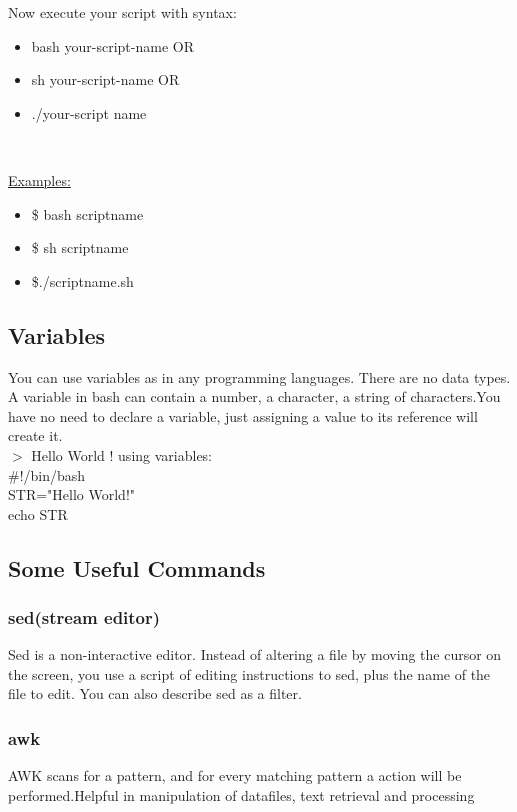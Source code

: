 \documentclass[a4paper, 12pt]{article}
\begin{document}
Now execute your script with syntax:
\begin{itemize}
\item bash your-script-name OR
\item sh your-script-name OR
\item ./your-script name
\end{itemize}

\

\underline{Examples:} \\
\begin{itemize}
\item \$ bash scriptname
\item \$ sh scriptname
\item \$./scriptname.sh
\end{itemize}

\subsection{Variables}
You can use variables as in any programming languages. There are no data types. A variable in bash can contain a number, 
a character, a string of characters.You have no need to declare a variable, just assigning a value to its reference will create it. \\

$>$ Hello World ! using variables:\\

 \noindent \#!/bin/bash \\         
 STR="Hello World!" \\
 echo \textdollar STR  \\
 
\subsection{Some Useful Commands} 
\subsubsection{sed(stream editor)}
Sed is a non-interactive editor. Instead of altering a file by moving the
cursor on the screen, you use a script of editing instructions to sed, plus the name of the file to edit. You can also describe sed as a filter.

\subsubsection{awk}
AWK scans for a pattern, and for every matching pattern a action will
be performed.Helpful in manipulation of datafiles, text retrieval and processing
 
\end{document}
